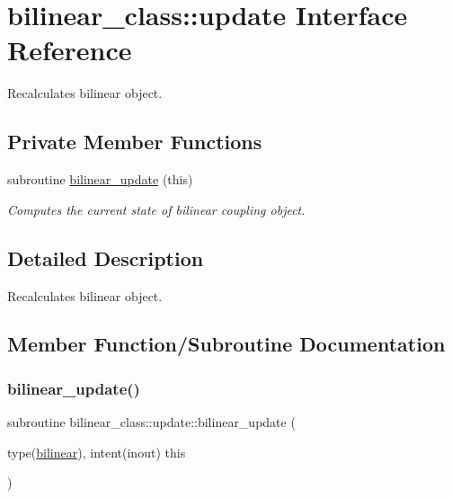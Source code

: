 \hypertarget{interfacebilinear__class_1_1update}{}\section{bilinear\+\_\+class\+:\+:update Interface Reference}
\label{interfacebilinear__class_1_1update}


Recalculates bilinear object.  


\subsection*{Private Member Functions}
\begin{DoxyCompactItemize}
\item 
subroutine \hyperlink{interfacebilinear__class_1_1update_afb6f840dd583c27ad2704aa1cdd17d68}{bilinear\+\_\+update} (this)
\begin{DoxyCompactList}\small\item\em Computes the current state of bilinear coupling object. \end{DoxyCompactList}\end{DoxyCompactItemize}


\subsection{Detailed Description}
Recalculates bilinear object. 

\subsection{Member Function/\+Subroutine Documentation}
\mbox{\label{interfacebilinear__class_1_1update_afb6f840dd583c27ad2704aa1cdd17d68}} 
\subsubsection{\texorpdfstring{bilinear\+\_\+update()}{bilinear\_update()}}
{\footnotesize\ttfamily subroutine bilinear\+\_\+class\+::update\+::bilinear\+\_\+update (\begin{DoxyParamCaption}\item[{type(\hyperlink{structbilinear__class_1_1bilinear}{bilinear}), intent(inout)}]{this }\end{DoxyParamCaption})\hspace{0.3cm}{\ttfamily [private]}}



